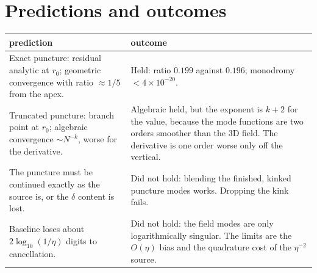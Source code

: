 \documentclass[11pt,a4paper]{article}
\begin{document}
\section{Predictions and outcomes}
\begin{table}[h]
\centering
\begin{tabular}{p{}p{}}
\toprule
prediction & outcome\\
\midrule
Exact puncture: residual analytic at $r_0$; geometric convergence with ratio $\approx1/5$ from the apex. & Held: ratio $0.199$ against $0.196$; monodromy $<4\times10^{-20}$.\\
Truncated puncture: branch point at $r_0$; algebraic convergence $\sim N^{-k}$, worse for the derivative. & Algebraic held, but the exponent is $k+2$ for the value, because the mode functions are two orders smoother than the 3D field. The derivative is one order worse only off the vertical.\\
The puncture must be continued exactly as the source is, or the $\delta$ content is lost. & Did not hold: blending the finished, kinked puncture modes works. Dropping the kink fails.\\
Baseline loses about $2\log_{10}(1/\eta)$ digits to cancellation. & Did not hold: the field modes are only logarithmically singular. The limits are the $O(\eta)$ bias and the quadrature cost of the $\eta^{-2}$ source.\\
\bottomrule
\end{tabular}
\end{table}
\end{document}
